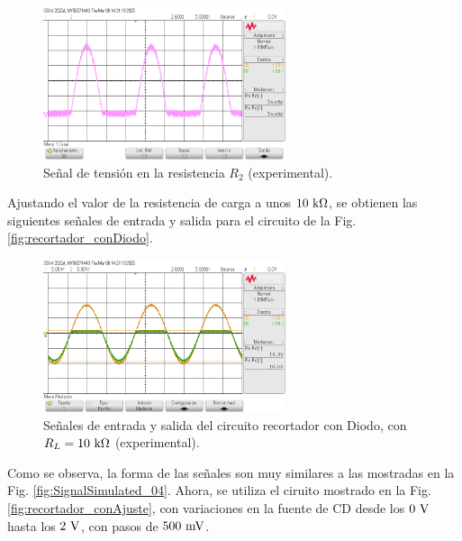 \documentclass[journal]{IEEEtran}
\begin{document}
\begin{figure}[H]
        \centering
        \includegraphics[width=2.8in]{SignalExperimental_04.png}
        \caption{Señal de tensión en la resistencia $R_2$ (experimental).}
        \label{fig:SignalExperimental_04}
\end{figure}

Ajustando el valor de la resistencia de carga a unos $10~\textnormal{k}\Omega$, se obtienen las siguientes señales de entrada y salida para el circuito de la Fig. \ref{fig:recortador_conDiodo}.
\begin{figure}[H]
        \centering
        \includegraphics[width=2.8in]{SignalExperimental_05.png}
        \caption{Señales de entrada y salida del circuito recortador con Diodo, con $R_L=10~\textnormal{k}\Omega$ (experimental).}
        \label{fig:SignalExperimental_05}
\end{figure}

Como se observa, la forma de las señales son muy similares a las mostradas en la Fig. \ref{fig:SignalSimulated_04}. Ahora, se utiliza el ciruito mostrado en la Fig. \ref{fig:recortador_conAjuste}, 
con variaciones en la fuente de CD desde los $0~\textnormal{V}$ hasta los $2~\textnormal{V}$, con pasos de $500~\textnormal{mV}$.
\end{document}
